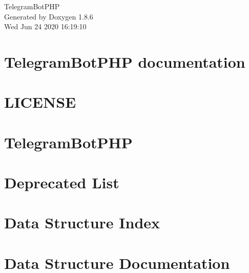 \documentclass[twoside]{book}
\newcommand{\clearemptydoublepage}{%
  \newpage{\pagestyle{empty}\cleardoublepage}%
}
\begin{document}
\hypersetup{pageanchor=false}
\begin{titlepage}
\vspace*{7cm}
\begin{center}%
{\Large Telegram\-Bot\-P\-H\-P }\\
\vspace*{1cm}
{\large Generated by Doxygen 1.8.6}\\
\vspace*{0.5cm}
{\small Wed Jun 24 2020 16:19:10}\\
\end{center}
\end{titlepage}
\clearemptydoublepage
\tableofcontents
\clearemptydoublepage
{}
\hypersetup{pageanchor=true}

\chapter{Telegram\-Bot\-P\-H\-P documentation}
\label{index}\hypertarget{index}{}
\chapter{L\-I\-C\-E\-N\-S\-E}
\label{md__home_travis_build__eleirbag89__telegram_bot_p_h_p__l_i_c_e_n_s_e}
\hypertarget{md__home_travis_build__eleirbag89__telegram_bot_p_h_p__l_i_c_e_n_s_e}{}

\chapter{Telegram\-Bot\-P\-H\-P}
\label{md__home_travis_build__eleirbag89__telegram_bot_p_h_p__r_e_a_d_m_e}
\hypertarget{md__home_travis_build__eleirbag89__telegram_bot_p_h_p__r_e_a_d_m_e}{}

\chapter{Deprecated List}
\label{deprecated}
\hypertarget{deprecated}{}

\chapter{Data Structure Index}

\chapter{Data Structure Documentation}



\newpage
{}
{}
\printindex
\end{document}
